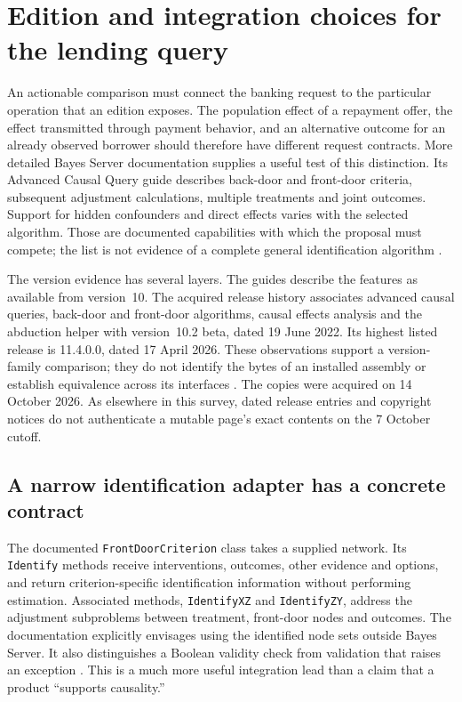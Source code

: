 \section{Edition and integration choices for the lending query}
\label{exec14:commercial-contracts}

An actionable comparison must connect the banking request to the particular
operation that an edition exposes. The population effect of a repayment offer,
the effect transmitted through payment behavior, and an alternative outcome
for an already observed borrower should therefore have different request
contracts. More detailed Bayes Server documentation supplies a useful test of
this distinction. Its Advanced Causal Query guide describes back-door and
front-door criteria, subsequent adjustment calculations, multiple treatments
and joint outcomes. Support for hidden confounders and direct effects varies
with the selected algorithm. Those are documented capabilities with which the
proposal must compete; the list is not evidence of a complete general
identification algorithm \citep{exec14_ci_causal_query}.

The version evidence has several layers. The guides describe the features as
available from version~10. The acquired release history associates advanced
causal queries, back-door and front-door algorithms, causal effects analysis
and the abduction helper with version~10.2 beta, dated 19 June 2022. Its highest
listed release is 11.4.0.0, dated 17 April 2026. These observations support a
version-family comparison; they do not identify the bytes of an installed
assembly or establish equivalence across its interfaces
\citep{exec14_ci_release_history}. The copies were acquired on 14 October
2026. As elsewhere in this survey, dated release entries and copyright notices
do not authenticate a mutable page's exact contents on the 7 October cutoff.

\subsection{A narrow identification adapter has a concrete contract}

The documented \texttt{FrontDoorCriterion} class takes a supplied network. Its
\texttt{Identify} methods receive interventions, outcomes, other evidence
and options, and return criterion-specific identification information without
performing estimation. Associated methods, \texttt{IdentifyXZ} and
\texttt{IdentifyZY}, address the adjustment subproblems between treatment,
front-door nodes and outcomes. The documentation explicitly envisages using
the identified node sets outside Bayes Server. It also distinguishes a Boolean
validity check from validation that raises an exception
\citep{exec14_ci_api_frontdoor}. This is a much more useful integration lead
than a claim that a product ``supports causality.''

